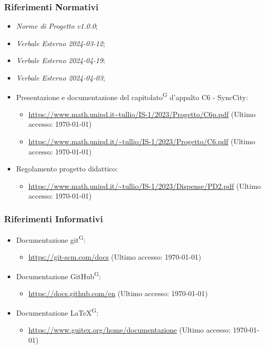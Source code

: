 \documentclass[8pt]{article}
\newcommand{\glossterm}[1]{#1\textsuperscript{G}} %
\begin{document}
\subsubsection{Riferimenti Normativi}
\begin{itemize}
	\setlength\itemsep{0em}
	\item \textit{Norme di Progetto v1.0.0};
  \item \textit{Verbale Esterno 2024-03-12};
	\item \textit{Verbale Esterno 2024-04-19};
	\item \textit{Verbale Esterno 2024-04-03};
  \item Presentazione e documentazione del \glossterm{capitolato} d'appalto C6 - SyncCity:
	\begin{itemize}
		\item \href{https://www.math.unipd.it/~tullio/IS-1/2023/Progetto/C6p.pdf}{https://www.math.unipd.it\textasciitilde{}tullio/IS-1/2023/Progetto/C6p.pdf} (Ultimo accesso: \today)
		\item \href{https://www.math.unipd.it/~tullio/IS-1/2023/Progetto/C6.pdf}{https://www.math.unipd.it/\textasciitilde{}tullio/IS-1/2023/Progetto/C6.pdf} (Ultimo accesso: \today)
  \end{itemize}
  \item Regolamento progetto didattico:
      \begin{itemize}
          \item \href{https://www.math.unipd.it/~tullio/IS-1/2023/Dispense/PD2.pdf}{https://www.math.unipd.it/\textasciitilde{}tullio/IS-1/2023/Dispense/PD2.pdf} (Ultimo accesso: \today)
    \end{itemize}
\end{itemize}
\subsubsection{Riferimenti Informativi}
\begin{itemize}
    \setlength\itemsep{0em}
    \item Documentazione \glossterm{git}: 
      \begin{itemize}
          \item \href{https://git-scm.com/docs}{https://git-scm.com/docs} (Ultimo accesso: \today)
      \end{itemize}
    \item Documentazione \glossterm{GitHub}: 
      \begin{itemize}
          \item \href{https://docs.github.com/en}{https://docs.github.com/en} (Ultimo accesso: \today)
      \end{itemize}
    \item Documentazione \glossterm{\LaTeX}: 
      \begin{itemize}
          \item \href{https://www.guitex.org/home/documentazione}{https://www.guitex.org/home/documentazione} (Ultimo accesso: \today)
      \end{itemize}
\end{itemize}
\newpage
\end{document}
